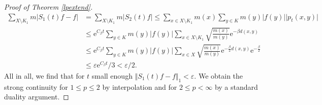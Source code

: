 \documentclass[10pt,a4paper]{amsart}
\begin{document}
\begin{proof}[Proof of Theorem \ref{lpextend}]
\begin{align*}
    \sum_{X\setminus K_1}m\vert S_1(t)f-f\vert &= \sum_{X\setminus K_1} m\vert S_2(t)f\vert\leq \sum_{x\in X\setminus K_1}m(x)\sum_{y\in K}m(y)\vert f(y)\vert\vert p_t(x,y)\vert\\
    &\leq \mathrm{e}^{C_\beta t}\sum_{y\in K}m(y)\vert f(y)\vert\sum_{x\in X\setminus K_1}\sqrt{\frac{m(x)}{m(y)}}\mathrm{e}^{-\beta d(x,y)}\\
    &\leq \mathrm{e}^{C_\beta t}\sum_{y\in K}m(y)\vert f(y)\vert\sum_{x\in X}\sqrt{\frac{m(x)}{m(y)}}\mathrm{e}^{-\frac{\beta}{2} d(x,y)}\mathrm{e}^{-\frac{\beta}{2}}\\
    &\leq \varepsilon\mathrm{e}^{C_\beta t}\slash 3< \varepsilon\slash 2.
\end{align*}
All in all, we find that for $t$ small enough $\Vert S_1(t)f-f\Vert_1<\varepsilon.$ We obtain the strong continuity for $1\leq p\leq 2$ by interpolation and for $2\leq p<\infty$ by a standard duality argument.\end{proof}
\end{document}
